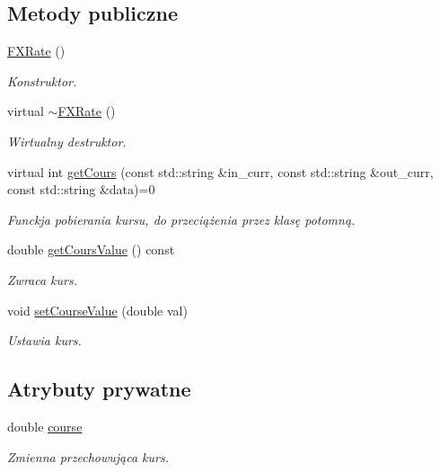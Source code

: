 \subsection*{\-Metody publiczne}
\begin{DoxyCompactItemize}
\item 
\hyperlink{class_f_x_rate_ad8179956bcbbfcbd0412f255da6e53c9}{\-F\-X\-Rate} ()
\begin{DoxyCompactList}\small\item\em \-Konstruktor. \end{DoxyCompactList}\item 
virtual \hyperlink{class_f_x_rate_aaa4c587bf43178e8018a5dacaae19cb6}{$\sim$\-F\-X\-Rate} ()
\begin{DoxyCompactList}\small\item\em \-Wirtualny destruktor. \end{DoxyCompactList}\item 
virtual int \hyperlink{class_f_x_rate_a702a09f1e591c4b80c576cdaee938a25}{get\-Cours} (const std\-::string \&in\-\_\-curr, const std\-::string \&out\-\_\-curr, const std\-::string \&data)=0
\begin{DoxyCompactList}\small\item\em \-Funckja pobierania kursu, do przeciążenia przez klasę potomną. \end{DoxyCompactList}\item 
double \hyperlink{class_f_x_rate_a1d5a691114520d11109841a1b9dae6a4}{get\-Cours\-Value} () const 
\begin{DoxyCompactList}\small\item\em \-Zwraca kurs. \end{DoxyCompactList}\item 
void \hyperlink{class_f_x_rate_ac28fb2050f6fd85272dddea359efe196}{set\-Course\-Value} (double val)
\begin{DoxyCompactList}\small\item\em \-Ustawia kurs. \end{DoxyCompactList}\end{DoxyCompactItemize}
\subsection*{\-Atrybuty prywatne}
\begin{DoxyCompactItemize}
\item 
double \hyperlink{class_f_x_rate_aeb6f7d78d616eab824ddd67407056de1}{course}
\begin{DoxyCompactList}\small\item\em \-Zmienna przechowująca kurs. \end{DoxyCompactList}\end{DoxyCompactItemize}


